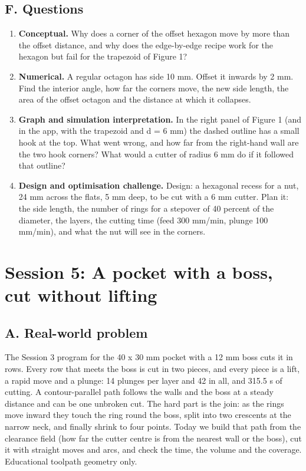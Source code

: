 \documentclass[11pt,a4paper]{article}
\begin{document}
\subsection*{F. Questions}
\begin{enumerate}[nosep]
\item \textbf{Conceptual.} Why does a corner of the offset hexagon move by more than the offset distance, and why does the edge-by-edge recipe work for the hexagon but fail for the trapezoid of Figure 1?
\item \textbf{Numerical.} A regular octagon has side 10 mm. Offset it inwards by 2 mm. Find the interior angle, how far the corners move, the new side length, the area of the offset octagon and the distance at which it collapses.
\item \textbf{Graph and simulation interpretation.} In the right panel of Figure 1 (and in the app, with the trapezoid and d = 6 mm) the dashed outline has a small hook at the top. What went wrong, and how far from the right-hand wall are the two hook corners? What would a cutter of radius 6 mm do if it followed that outline?
\item \textbf{Design and optimisation challenge.} Design: a hexagonal recess for a nut, 24 mm across the flats, 5 mm deep, to be cut with a 6 mm cutter. Plan it: the side length, the number of rings for a stepover of 40 percent of the diameter, the layers, the cutting time (feed 300 mm/min, plunge 100 mm/min), and what the nut will see in the corners.
\end{enumerate}

\section{Session 5: A pocket with a boss, cut without lifting}

\subsection*{A. Real-world problem}
The Session 3 program for the 40 x 30 mm pocket with a 12 mm boss cuts it in rows. Every row that meets the boss is cut in two pieces, and every piece is a lift, a rapid move and a plunge: 14 plunges per layer and 42 in all, and 315.5 s of cutting. A contour-parallel path follows the walls and the boss at a steady distance and can be one unbroken cut. The hard part is the join: as the rings move inward they touch the ring round the boss, split into two crescents at the narrow neck, and finally shrink to four points. Today we build that path from the clearance field (how far the cutter centre is from the nearest wall or the boss), cut it with straight moves and arcs, and check the time, the volume and the coverage. Educational toolpath geometry only.
\end{document}

